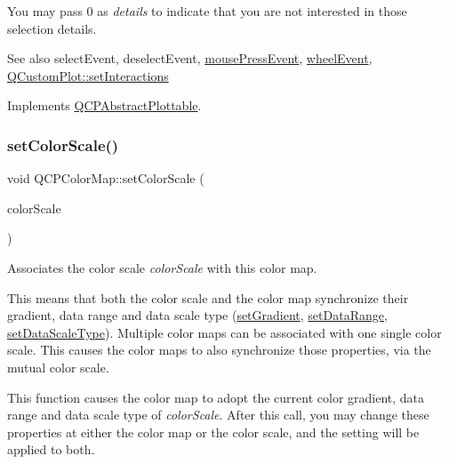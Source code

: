 You may pass 0 as {\itshape details} to indicate that you are not interested in those selection details.

\begin{DoxySeeAlso}{See also}
select\+Event, deselect\+Event, \mbox{\hyperlink{class_q_c_p_layerable_af6567604818db90f4fd52822f8bc8376}{mouse\+Press\+Event}}, \mbox{\hyperlink{class_q_c_p_layerable_a47dfd7b8fd99c08ca54e09c362b6f022}{wheel\+Event}}, \mbox{\hyperlink{class_q_custom_plot_a5ee1e2f6ae27419deca53e75907c27e5}{Q\+Custom\+Plot\+::set\+Interactions}} 
\end{DoxySeeAlso}


Implements \mbox{\hyperlink{class_q_c_p_abstract_plottable_a38efe9641d972992a3d44204bc80ec1d}{Q\+C\+P\+Abstract\+Plottable}}.

\mbox{\label{class_q_c_p_color_map_aa828921db364fe3c6af4619580ab85fd}} 
\subsubsection{\texorpdfstring{set\+Color\+Scale()}{setColorScale()}}
{\footnotesize\ttfamily void Q\+C\+P\+Color\+Map\+::set\+Color\+Scale (\begin{DoxyParamCaption}\item[{\mbox{\hyperlink{class_q_c_p_color_scale}{Q\+C\+P\+Color\+Scale}} $\ast$}]{color\+Scale }\end{DoxyParamCaption})}

Associates the color scale {\itshape color\+Scale} with this color map.

This means that both the color scale and the color map synchronize their gradient, data range and data scale type (\mbox{\hyperlink{class_q_c_p_color_map_a7313c78360471cead3576341a2c50377}{set\+Gradient}}, \mbox{\hyperlink{class_q_c_p_color_map_a980b42837821159786a85b4b7dcb8774}{set\+Data\+Range}}, \mbox{\hyperlink{class_q_c_p_color_map_a9d20aa08e3c1f20f22908c45b9c06511}{set\+Data\+Scale\+Type}}). Multiple color maps can be associated with one single color scale. This causes the color maps to also synchronize those properties, via the mutual color scale.

This function causes the color map to adopt the current color gradient, data range and data scale type of {\itshape color\+Scale}. After this call, you may change these properties at either the color map or the color scale, and the setting will be applied to both.

